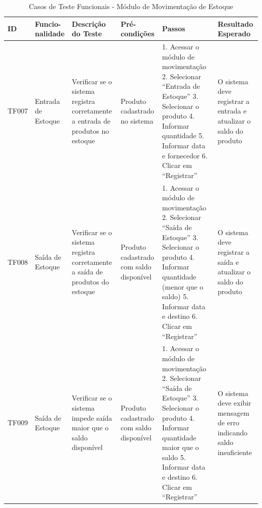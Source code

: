 \documentclass[
	12pt,				%
	openany,			%
	twoside,			%
	a4paper,			%
	english,			%
	brazil				%
	]{abntex2}
\begin{document}
\begin{table}[htbp]

\caption{Casos de Teste Funcionais - Módulo de Movimentação de Estoque}
\begin{tabular}{|p{1cm}|p{1.7cm}|p{3.3cm}|p{2.2cm}|p{3.5cm}|p{3.5cm}|}
\hline
\textbf{ID} & \textbf{Funcio-nalidade} & \textbf{Descrição do Teste} & \textbf{Pré-condições} & \textbf{Passos} & \textbf{Resultado Esperado} \\
\hline
TF007 & Entrada de Estoque & Verificar se o sistema registra corretamente a entrada de produtos no estoque & Produto cadastrado no sistema & 
1. Acessar o módulo de movimentação
2. Selecionar ``Entrada de Estoque''
3. Selecionar o produto
4. Informar quantidade
5. Informar data e fornecedor
6. Clicar em ``Registrar'' & 
O sistema deve registrar a entrada e atualizar o saldo do produto \\
\hline
TF008 & Saída de Estoque & Verificar se o sistema registra corretamente a saída de produtos do estoque & Produto cadastrado com saldo disponível & 
1. Acessar o módulo de movimentação
2. Selecionar ``Saída de Estoque''
3. Selecionar o produto
4. Informar quantidade (menor que o saldo)
5. Informar data e destino
6. Clicar em ``Registrar'' & 
O sistema deve registrar a saída e atualizar o saldo do produto \\
\hline
TF009 & Saída de Estoque & Verificar se o sistema impede saída maior que o saldo disponível & Produto cadastrado com saldo disponível & 
1. Acessar o módulo de movimentação
2. Selecionar ``Saída de Estoque''
3. Selecionar o produto
4. Informar quantidade maior que o saldo
5. Informar data e destino
6. Clicar em ``Registrar'' & 
O sistema deve exibir mensagem de erro indicando saldo insuficiente \\
\hline
\end{tabular}
\end{table}

\FloatBarrier
\end{document}
